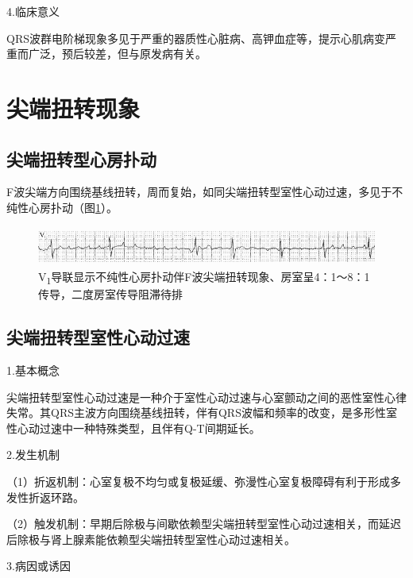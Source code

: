 4.临床意义

QRS波群电阶梯现象多见于严重的器质性心脏病、高钾血症等，提示心肌病变严重而广泛，预后较差，但与原发病有关。

\protect\hypertarget{text00046.htmlux5cux23subid518}{}{}

\section{尖端扭转现象}

\protect\hypertarget{text00046.htmlux5cux23subid519}{}{}

\subsection{尖端扭转型心房扑动}

F波尖端方向围绕基线扭转，周而复始，如同尖端扭转型室性心动过速，多见于不纯性心房扑动（图\ref{fig39-10}）。

\begin{figure}[!htbp]
 \centering
 \includegraphics[width=5.58333in,height=0.51042in]{./images/Image00659.jpg}
 \captionsetup{justification=centering}
 \caption{V\textsubscript{1}导联显示不纯性心房扑动伴F波尖端扭转现象、房室呈4：1～8：1传导，二度房室传导阻滞待排}
 \label{fig39-10}
  \end{figure} 


\protect\hypertarget{text00046.htmlux5cux23subid520}{}{}

\subsection{尖端扭转型室性心动过速}

1.基本概念

尖端扭转型室性心动过速是一种介于室性心动过速与心室颤动之间的恶性室性心律失常。其QRS主波方向围绕基线扭转，伴有QRS波幅和频率的改变，是多形性室性心动过速中一种特殊类型，且伴有Q-T间期延长。

2.发生机制

（1）折返机制：心室复极不均匀或复极延缓、弥漫性心室复极障碍有利于形成多发性折返环路。

（2）触发机制：早期后除极与间歇依赖型尖端扭转型室性心动过速相关，而延迟后除极与肾上腺素能依赖型尖端扭转型室性心动过速相关。

3.病因或诱因

